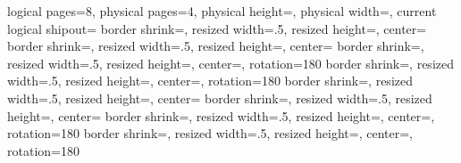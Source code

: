 %
{%
  \edef\pgfpageoptionheight{\the\paperwidth} %
  \edef\pgfpageoptionwidth{\the\paperheight}
  \def\pgfpageoptionborder{0pt}
  \def\pgfpageoptionbordercode{}
  \def\pgfpageoptionfirstshipout{1}
}%
{%
  \pgfpagesphysicalpageoptions
  {%
    logical pages=8,%
    physical pages=4,%
    physical height=\pgfpageoptionheight,%
    physical width=\pgfpageoptionwidth,%
    current logical shipout=\pgfpageoptionfirstshipout%
  }
    {%
      border shrink=\pgfpageoptionborder,%
      resized width=.5\pgfphysicalwidth,%
      resized height=\pgfphysicalheight,%
      center=\pgfpoint{.25\pgfphysicalwidth}{.5\pgfphysicalheight}%
    }%
    {%
      border shrink=\pgfpageoptionborder,%
      resized width=.5\pgfphysicalwidth,%
      resized height=\pgfphysicalheight,%
      center=\pgfpoint{.75\pgfphysicalwidth}{.5\pgfphysicalheight}%
    }%
    {%
      border shrink=\pgfpageoptionborder,%
      resized width=.5\pgfphysicalwidth,%
      resized height=\pgfphysicalheight,%
      center=\pgfpoint{.25\pgfphysicalwidth}{.5\pgfphysicalheight},%
      rotation=180%
    }%
    {%
      border shrink=\pgfpageoptionborder,%
      resized width=.5\pgfphysicalwidth,%
      resized height=\pgfphysicalheight,%
      center=\pgfpoint{.75\pgfphysicalwidth}{.5\pgfphysicalheight},%
      rotation=180%
    }%
    {%
      border shrink=\pgfpageoptionborder,%
      resized width=.5\pgfphysicalwidth,%
      resized height=\pgfphysicalheight,%
      center=\pgfpoint{.25\pgfphysicalwidth}{.5\pgfphysicalheight}%
    }%
    {%
      border shrink=\pgfpageoptionborder,%
      resized width=.5\pgfphysicalwidth,%
      resized height=\pgfphysicalheight,%
      center=\pgfpoint{.75\pgfphysicalwidth}{.5\pgfphysicalheight}%
    }%
    {%
      border shrink=\pgfpageoptionborder,%
      resized width=.5\pgfphysicalwidth,%
      resized height=\pgfphysicalheight,%
      center=\pgfpoint{.25\pgfphysicalwidth}{.5\pgfphysicalheight},%
      rotation=180%
    }%
    {%
      border shrink=\pgfpageoptionborder,%
      resized width=.5\pgfphysicalwidth,%
      resized height=\pgfphysicalheight,%
      center=\pgfpoint{.75\pgfphysicalwidth}{.5\pgfphysicalheight},%
      rotation=180%
    }%
}


